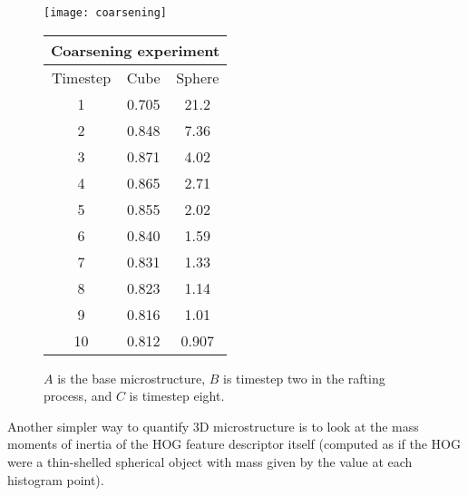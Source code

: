 \documentclass[review]{elsarticle}
\begin{document}
	\begin{figure}[!ht]
    	\begin{center}
			\texttt{[image: coarsening]}
	  		\caption{ $A$ is the base microstructure, $B$ is timestep two in the rafting process, and $C$ is timestep eight. }
	  		\label{figure8}
  		
			\begin{tabular}{ c | c | c }
				\multicolumn{3}{c}{Coarsening experiment} \\
				\hline
				Timestep & Cube & Sphere \\
				\hline
				1 & 0.705 & 21.2 \\
				2 & 0.848 & 7.36 \\
				3 & 0.871 & 4.02 \\
				4 & 0.865 & 2.71 \\
				5 & 0.855 & 2.02 \\
				6 & 0.840 & 1.59 \\
				7 & 0.831 & 1.33 \\
				8 & 0.823 & 1.14 \\
				9 & 0.816 & 1.01 \\
				10 & 0.812 & 0.907 \\
				\hline
			\end{tabular}
			\label{table3}
		\end{center}
	\end{figure}
	
	Another simpler way to quantify 3D microstructure is to look at the mass moments of inertia of the HOG feature descriptor itself (computed as if the HOG were a thin-shelled spherical object with mass given by the value at each histogram point).
	
\end{document}
